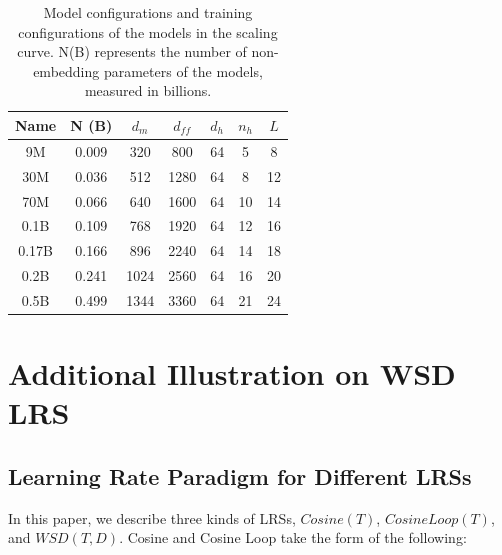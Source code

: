 \begin{table}[htbp]
    \centering
    \begin{tabular}{c|cccccc}
    \toprule
        \textbf{Name} & \textbf{N (B)}& $d_m$ & $d_{ff}$ &$d_h$ & $n_h$ & $L$ \\
    \midrule
          9M    &  0.009 & 320 & 800 & 64 & 5 & 8\\
           30M &   0.036 & 512 & 1280 & 64 & 8 & 12  \\
          70M &  0.066 & 640 & 1600 & 64 & 10 & 14\\
          0.1B &  0.109 & 768 & 1920 & 64 & 12 & 16  \\
         0.17B &  0.166 & 896 & 2240 & 64 & 14 & 18 \\
         0.2B&  0.241 & 1024 & 2560 & 64 & 16 & 20 \\
        0.5B& 0.499 & 1344 & 3360 & 64 & 21 & 24 \\
    \bottomrule
    \end{tabular}
    \caption{Model configurations and training configurations of the models in the scaling curve. N(B) represents the number of non-embedding parameters of the models, measured in billions.
    }
    \label{tab:appmodel_configs}
\end{table}

\section{Additional Illustration on WSD LRS}
\subsection{Learning Rate Paradigm for Different LRSs}
\label{app:lrsequ}
In this paper, we describe three kinds of LRSs, $Cosine(T)$, $CosineLoop(T)$, and $WSD(T, D)$. 
Cosine and Cosine Loop take the form of the following:


